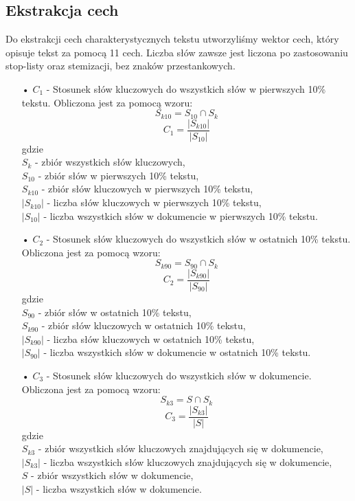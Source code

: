 \documentclass{classrep}
\begin{document}
\subsection{Ekstrakcja cech}
Do ekstrakcji cech charakterystycznych tekstu utworzyliśmy wektor cech, który opisuje tekst za pomocą 11 cech. Liczba słów zawsze jest liczona po zastosowaniu stop-listy oraz stemizacji, bez znaków przestankowych.
\begin{itemize}
\item[•] $C_1$ - Stosunek słów kluczowych do wszystkich słów w pierwszych 10\% tekstu. Obliczona jest za pomocą wzoru:
\begin{equation} S_{k10} = S_{10} \cap S_k  \end{equation}
\begin{equation} C_1 = \frac{|S_{k10}|}{|S_{10}|}   \end{equation} gdzie \\
$S_k$ - zbiór wszystkich słów kluczowych, \\
$S_{10}$ - zbiór słów w pierwszych 10\% tekstu, \\
$S_{k10}$ - zbiór słów kluczowych w pierwszych 10\% tekstu, \\
$|S_{k10}|$ - liczba słów kluczowych w pierwszych 10\% tekstu, \\
$|S_{10}|$ - liczba wszystkich słów w dokumencie w pierwszych 10\% tekstu. \\

\item[•] $C_2$ - Stosunek słów kluczowych do wszystkich słów w ostatnich 10\% tekstu. Obliczona jest za pomocą wzoru:
\begin{equation} S_{k90} = S_{90} \cap S_k  \end{equation}
\begin{equation} C_2 = \frac{|S_{k90}|}{|S_{90}|}   \end{equation}
 gdzie \\
$S_{90}$ - zbiór słów w ostatnich 10\% tekstu, \\
$S_{k90}$ - zbiór słów kluczowych w ostatnich 10\% tekstu, \\
$|S_{k90}|$ - liczba słów kluczowych w ostatnich 10\% tekstu, \\
$|S_{90}|$ - liczba wszystkich słów w dokumencie w ostatnich 10\% tekstu. \\

\item[•] $C_3$ - Stosunek słów kluczowych do wszystkich słów w dokumencie. Obliczona jest za pomocą wzoru:
\begin{equation} S_{k3} = S \cap S_k  \end{equation}
\begin{equation} C_3 = \frac{|S_{k3}|}{|S|}  \end{equation} gdzie \\
$S_{k3}$ - zbiór wszystkich słów kluczowych znajdujących się w dokumencie, \\
$|S_{k3}|$ - liczba wszystkich słów kluczowych znajdujących się w dokumencie, \\
$S$ - zbiór wszystkich słów w dokumencie, \\
$|S|$ - liczba wszystkich słów w dokumencie. \\


\end{itemize}
\end{document}
